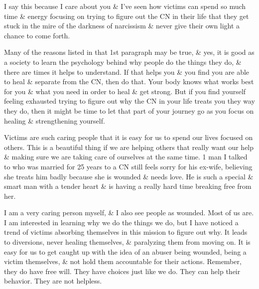 \documentclass{article}
\numberwithin{equation}{section}
\begin{document}
I say this because I care about you \& I've seen how victims can spend so much time \& energy focusing on trying to figure out the CN in their life that they get stuck in the mire of the darkness of narcissism \& never give their own light a chance to come forth.

Many of the reasons listed in that 1st paragraph may be true, \& yes, it is good as a society to learn the psychology behind why people do the things they do, \& there are times it helps to understand. If that helps you \& you find you are able to heal \& separate from the CN, then do that. Your body knows what works best for you \& what you need in order to heal \& get strong. But if you find yourself feeling exhausted trying to figure out why the CN in your life treats you they way they do, then it might be time to let that part of your journey go as you focus on healing \& strengthening yourself.

Victims are such caring people that it is easy for us to spend our lives focused on others. This is a beautiful thing if we are helping others that really want our help \& making sure we are taking care of ourselves at the same time. 1 man I talked to who was married for 25 years to a CN still feels sorry for his ex-wife, believing she treats him badly because she is wounded \& needs love. He is such a special \& smart man with a tender heart \& is having a really hard time breaking free from her.

I am a very caring person myself, \& I also see people as wounded. Most of us are. I am interested in learning why we do the things we do, but I have noticed a trend of victims absorbing themselves in this mission to figure out why. It leads to diversions, never healing themselves, \& paralyzing them from moving on. It is easy for us to get caught up with the idea of an abuser being wounded, being a victim themselves, \& not hold them accountable for their actions. Remember, they do have free will. They have choices just like we do. They can help their behavior. They are not helpless.
\end{document}
